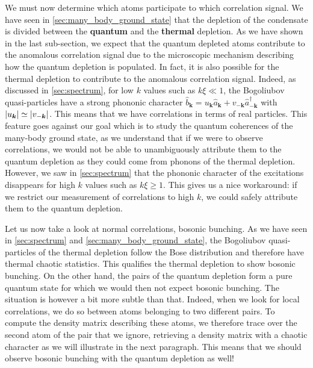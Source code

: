 We must now determine which atoms participate to which correlation signal. We have seen in \ref{sec:many_body_ground_state} that the depletion of the condensate is divided between the \textbf{quantum} and the \textbf{thermal} depletion. As we have shown in the last sub-section, we expect that the quantum depleted atoms contribute to the anomalous \kmk correlation signal due to the microscopic mechanism describing how the quantum depletion is populated. In fact, it is also possible for the thermal depletion to contribute to the anomalous correlation signal. Indeed, as discussed in \ref{sec:spectrum}, for low $k$ values such as $k \xi \ll 1$, the Bogoliubov quasi-particles have a strong phononic character $\hat{b}_{\bm{k}}=u_{\bm{k}} \hat{a}_{\bm{k}} + v_{-\bm{k}} \hat{a}^{\dagger}_{-\bm{k}}$ with $\left\lvert u_{\bm{k}}\right\rvert \simeq \left\lvert v_{-\bm{k}}\right\rvert$. This means that we have \kmk correlations in terms of real particles. This feature goes against our goal which is to study the quantum coherences of the many-body ground state, as we understand that if we were to observe \kmk correlations, we would not be able to unambiguously attribute them to the quantum depletion as they could come from phonons of the thermal depletion. However, we saw in \ref{sec:spectrum} that the phononic character of the excitations disappears for high $k$ values such as $k\xi \geq 1$. This gives us a nice workaround: if we restrict our measurement of \kmk correlations to high $k$, we could safely attribute them to the quantum depletion.

Let us now take a look at normal correlations, \ie bosonic bunching. As we have seen in \ref{sec:spectrum} and \ref{sec:many_body_ground_state}, the Bogoliubov quasi-particles of the thermal depletion follow the Bose distribution and therefore have thermal chaotic statistics. This qualifies the thermal depletion to show bosonic bunching. On the other hand, the \kmk pairs of the quantum depletion form a pure quantum state for which we would then not expect bosonic bunching. The situation is however a bit more subtle than that. Indeed, when we look for local \kk correlations, we do so between atoms belonging to two different pairs. To compute the density matrix describing these atoms, we therefore trace over the second atom of the pair that we ignore, retrieving a density matrix with a chaotic character \cite{yurke1987} as we will illustrate in the next paragraph. This means that we should observe bosonic bunching with the quantum depletion as well!


